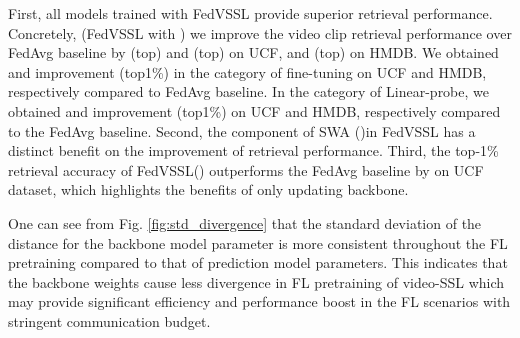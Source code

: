 First, all models trained with FedVSSL provide superior retrieval performance.
Concretely, (FedVSSL with ) we improve the video clip retrieval performance over FedAvg baseline by  (top) and  (top) on UCF, and  (top) on HMDB. We obtained  and  improvement (top1\%) in the category of fine-tuning  on UCF and HMDB, respectively compared to FedAvg baseline. In the category of Linear-probe, we obtained  and  improvement (top1\%) on UCF and HMDB, respectively compared to the FedAvg baseline.  
Second, the component of SWA ()in FedVSSL has a distinct benefit on the improvement of retrieval performance. 
Third, the top-1\% retrieval accuracy of FedVSSL() outperforms the FedAvg baseline by  on UCF dataset, which highlights the benefits of only updating backbone. 


One can see from Fig. \ref{fig:std_divergence} that the standard deviation of the  distance for the backbone model parameter is more consistent throughout the FL pretraining compared to that of prediction model parameters. This indicates that the backbone weights cause less divergence in FL pretraining of video-SSL which may provide significant efficiency and performance boost in the FL scenarios with stringent communication budget. 

    



